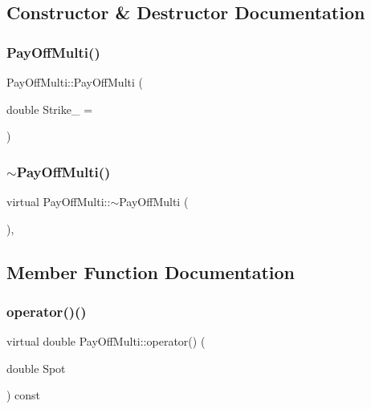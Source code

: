 \subsection{Constructor \& Destructor Documentation}
\hypertarget{classPayOffMulti_ad1fecb3813a6d00d55dd9f72d7459237}{}\label{classPayOffMulti_ad1fecb3813a6d00d55dd9f72d7459237} 
\subsubsection{\texorpdfstring{Pay\+Off\+Multi()}{PayOffMulti()}}
{\footnotesize\ttfamily Pay\+Off\+Multi\+::\+Pay\+Off\+Multi (\begin{DoxyParamCaption}\item[{double}]{Strike\+\_\+ = {} }\end{DoxyParamCaption})}

\hypertarget{classPayOffMulti_a148f588f7b00f744c2d755ae551d5e78}{}\label{classPayOffMulti_a148f588f7b00f744c2d755ae551d5e78} 
\subsubsection{\texorpdfstring{$\sim$\+Pay\+Off\+Multi()}{~PayOffMulti()}}
{\footnotesize\ttfamily virtual Pay\+Off\+Multi\+::$\sim$\+Pay\+Off\+Multi (\begin{DoxyParamCaption}{ }\end{DoxyParamCaption})\hspace{0.3cm}{\ttfamily [inline]}, {\ttfamily [virtual]}}



\subsection{Member Function Documentation}
\hypertarget{classPayOffMulti_a1fc1c64c8db3c7b17dd1e51062874775}{}\label{classPayOffMulti_a1fc1c64c8db3c7b17dd1e51062874775} 
\subsubsection{\texorpdfstring{operator()()}{operator()()}\hspace{0.1cm}{\footnotesize\ttfamily [1/2]}}
{\footnotesize\ttfamily virtual double Pay\+Off\+Multi\+::operator() (\begin{DoxyParamCaption}\item[{double}]{Spot }\end{DoxyParamCaption}) const\hspace{0.3cm}{\ttfamily [virtual]}}




